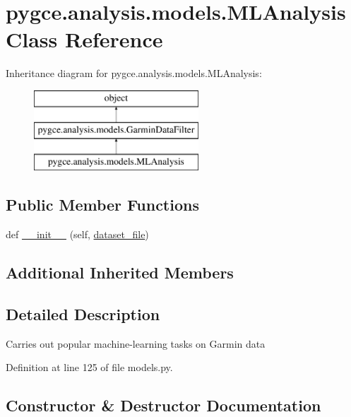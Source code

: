 \hypertarget{classpygce_1_1analysis_1_1models_1_1_m_l_analysis}{}\section{pygce.\+analysis.\+models.\+M\+L\+Analysis Class Reference}
\label{classpygce_1_1analysis_1_1models_1_1_m_l_analysis}
Inheritance diagram for pygce.\+analysis.\+models.\+M\+L\+Analysis\+:\begin{figure}[H]
\begin{center}
\leavevmode
\includegraphics[height=3.000000cm]{classpygce_1_1analysis_1_1models_1_1_m_l_analysis}
\end{center}
\end{figure}
\subsection*{Public Member Functions}
\begin{DoxyCompactItemize}
\item 
def \hyperlink{classpygce_1_1analysis_1_1models_1_1_m_l_analysis_a87a6dea18d5aa1163763e66f0142dca8}{\+\_\+\+\_\+init\+\_\+\+\_\+} (self, \hyperlink{classpygce_1_1analysis_1_1models_1_1_garmin_data_filter_a7bb7be05577c2d31546e27823a5d11c5}{dataset\+\_\+file})
\end{DoxyCompactItemize}
\subsection*{Additional Inherited Members}


\subsection{Detailed Description}
\begin{DoxyVerb}Carries out popular machine-learning tasks on Garmin data \end{DoxyVerb}
 

Definition at line 125 of file models.\+py.



\subsection{Constructor \& Destructor Documentation}
